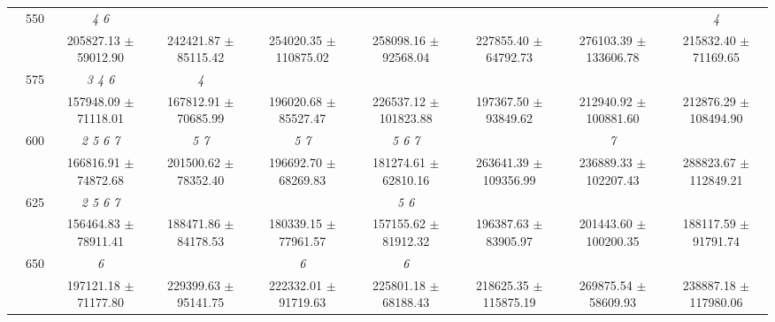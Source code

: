 \begin{table}[h]
{\begin{tabular}{
        ccccccccc}
 & \multirow{2}{*}{550}& \textit{ 4 6 }& & & & & & \textit{ 4 } \\ 
 & & 205827.13 $\pm$ 59012.90& 242421.87 $\pm$ 85115.42& 254020.35 $\pm$ 110875.02& 258098.16 $\pm$ 92568.04& 227855.40 $\pm$ 64792.73& 276103.39 $\pm$ 133606.78& 215832.40 $\pm$ 71169.65 \\ 
 & \multirow{2}{*}{575}& \cellcolor[HTML]{EFEFEF} \textit{ 3 4 6 }& \cellcolor[HTML]{EFEFEF} \textit{ 4 }& \cellcolor[HTML]{EFEFEF} & \cellcolor[HTML]{EFEFEF} & \cellcolor[HTML]{EFEFEF} & \cellcolor[HTML]{EFEFEF} & \cellcolor[HTML]{EFEFEF}  \\ 
 & & \cellcolor[HTML]{EFEFEF} 157948.09 $\pm$ 71118.01& \cellcolor[HTML]{EFEFEF} 167812.91 $\pm$ 70685.99& \cellcolor[HTML]{EFEFEF} 196020.68 $\pm$ 85527.47& \cellcolor[HTML]{EFEFEF} 226537.12 $\pm$ 101823.88& \cellcolor[HTML]{EFEFEF} 197367.50 $\pm$ 93849.62& \cellcolor[HTML]{EFEFEF} 212940.92 $\pm$ 100881.60& \cellcolor[HTML]{EFEFEF} 212876.29 $\pm$ 108494.90 \\ 
 & \multirow{2}{*}{600}& \textit{ 2 5 6 7 }& \textit{ 5 7 }& \textit{ 5 7 }& \textit{ 5 6 7 }& & \textit{ 7 }&  \\ 
 & & 166816.91 $\pm$ 74872.68& 201500.62 $\pm$ 78352.40& 196692.70 $\pm$ 68269.83& 181274.61 $\pm$ 62810.16& 263641.39 $\pm$ 109356.99& 236889.33 $\pm$ 102207.43& 288823.67 $\pm$ 112849.21 \\ 
 & \multirow{2}{*}{625}& \cellcolor[HTML]{EFEFEF} \textit{ 2 5 6 7 }& \cellcolor[HTML]{EFEFEF} & \cellcolor[HTML]{EFEFEF} & \cellcolor[HTML]{EFEFEF} \textit{ 5 6 }& \cellcolor[HTML]{EFEFEF} & \cellcolor[HTML]{EFEFEF} & \cellcolor[HTML]{EFEFEF}  \\ 
 & & \cellcolor[HTML]{EFEFEF} 156464.83 $\pm$ 78911.41& \cellcolor[HTML]{EFEFEF} 188471.86 $\pm$ 84178.53& \cellcolor[HTML]{EFEFEF} 180339.15 $\pm$ 77961.57& \cellcolor[HTML]{EFEFEF} 157155.62 $\pm$ 81912.32& \cellcolor[HTML]{EFEFEF} 196387.63 $\pm$ 83905.97& \cellcolor[HTML]{EFEFEF} 201443.60 $\pm$ 100200.35& \cellcolor[HTML]{EFEFEF} 188117.59 $\pm$ 91791.74 \\ 
 & \multirow{2}{*}{650}& \textit{ 6 }& & \textit{ 6 }& \textit{ 6 }& & &  \\ 
 & & 197121.18 $\pm$ 71177.80& 229399.63 $\pm$ 95141.75& 222332.01 $\pm$ 91719.63& 225801.18 $\pm$ 68188.43& 218625.35 $\pm$ 115875.19& 269875.54 $\pm$ 58609.93& 238887.18 $\pm$ 117980.06 \\ \midrule 

        \bottomrule
        \end{tabular}%
        }

        \end{table}
        

